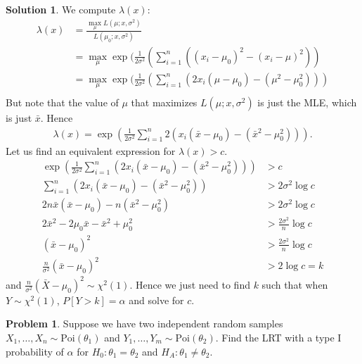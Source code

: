 \documentclass[11pt]{amsart}
\theoremstyle{definition}
\newtheorem{problem}[theorem]{Problem}
\newtheorem{solution}[theorem]{Solution}
\numberwithin{equation}{section}
\begin{document}
\begin{solution}
    We compute $\lambda(x)$:
    \begin{align*}
        \lambda(x)&=\frac{\max_\mu L(\mu;x,\sigma^2)}{L(\mu_0;x,\sigma^2)}\\
        &=\max_\mu\exp(\frac{1}{2\sigma^2}(\sum_{i=1}^n((x_i-\mu_0)^2-(x_i-\mu)^2))\\
        &=\max_\mu\exp(\frac{1}{2\sigma^2}(\sum_{i=1}^n(2x_i(\mu-\mu_0)-(\mu^2-\mu_0^2)))\\
    \end{align*}
    But note that the value of $\mu$ that maximizes $L(\mu;x,\sigma^2)$ is just the MLE, which is just $\bar x$. Hence
    \begin{align*}
        \lambda(x)=\exp(\frac{1}{2\sigma^2}\sum_{i=1}^n2(x_i(\bar x-\mu_0)-(\bar x^2-\mu_0^2))).
    \end{align*}
    Let us find an equivalent expression for $\lambda(x)>c$.
    \begin{align*}
        \exp(\frac{1}{2\sigma^2}\sum_{i=1}^n(2x_i(\bar x-\mu_0)-(\bar x^2-\mu_0^2)))&>c\\
        \sum_{i=1}^n(2x_i(\bar x-\mu_0)-(\bar x^2-\mu_0^2))&>2\sigma^2\log c\\
        2n\bar x(\bar x-\mu_0)-n(\bar x^2-\mu_0^2)&>2\sigma^2\log c\\
        2\bar x^2-2\mu_0\bar x-\bar x^2+\mu_0^2&>\frac{2\sigma^2}{n}\log c\\
        (\bar x-\mu_0)^2&>\frac{2\sigma^2}{n}\log c\\
        \frac{n}{\sigma^2}(\bar x-\mu_0)^2&>2\log c=k
    \end{align*}
    and $\frac{n}{\sigma^2}(\bar X-\mu_0)^2\sim\chi^2(1)$. Hence we just need to find $k$ such that when $Y\sim\chi^2(1)$, $P[Y> k]=\alpha$ and solve for $c$.
\end{solution}
\begin{problem}
    Suppose we have two independent random samples $X_1,\ldots,X_n\sim \mathrm{Poi}(\theta_1)$ and $Y_1,\ldots,Y_m\sim\mathrm{Poi}(\theta_2)$. Find the LRT with a type I probability of $\alpha$ for $H_0:\theta_1=\theta_2$ and $H_A:\theta_1\ne\theta_2$.
\end{problem}
\end{document}
